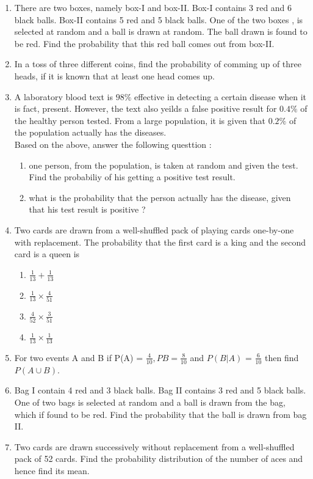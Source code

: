 \begin{enumerate}[label=\thesection.\arabic*.,ref=\thesection.\theenumi]
\item There are two boxes, namely box-I and box-II. Box-I contains  3 red and 6 black balls. Box-II contains 5 red and 5 black balls. One of the two boxes , is selected at random and a ball is drawn at random. The ball drawn is found to be red. Find the probability that this red ball comes out from box-II.
\item In a toss of three different coins, find the probability of comming up of three heads, if it is known that at least one head comes up.
\item A laboratory blood text is $98\%$ effective  in detecting a certain disease when it is fact, present. However, the text also yeilds a false positive result for $0.4\%$ of the healthy person tested. From a large population, it is given that $0.2\%$ of the population actually has the diseases.
\\Based on the above, answer the following questtion : 
\begin{enumerate}
\item one person, from the population, is taken at random and given the test. Find the probabiliy of his getting a positive test result.
\item what is the probability that the person actually has the disease, given that his test result is positive ?
\end{enumerate}
\item Two cards are drawn from a well-shuffled pack of playing cards one-by-one with replacement. The probability that the first card is a king and the second card is a queen is 
\begin{enumerate}
\item $\frac{1}{13} + \frac{1}{13}$
\item $ \frac{1}{13} \times \frac{4}{51}$
\item $\frac{4}{52} \times \frac{3}{51}$
\item $\frac{1}{13} \times \frac{1}{13}$
\end{enumerate}
\item For two events A and B if P(A) = $\frac{4}{10}, P{B} = \frac{8}{10}$ and $P(B|A)$ = $\frac{6}{10}$ then find $P( A \cup B).$
\item Bag I contain 4 red and 3 black balls. Bag II contains 3 red and 5 black balls. One of two bags is selected at random and a ball is drawn from the bag, which if found to be red. Find the probability that the ball is drawn from bag II.
\item Two cards are drawn successively without replacement from a well-shuffled pack of 52 cards. Find the probability distribution of the number of aces and hence find its mean.

\end{enumerate}
